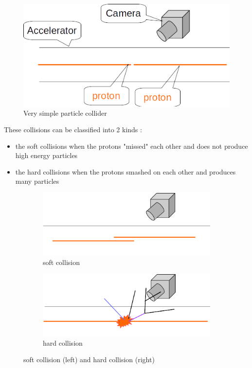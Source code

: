 \begin{figure}[htb]
    \centering
    \includegraphics[width=0.8\linewidth]{particle_collider_0}
    \caption{Very simple particle collider}
    \label{fig:particle_collider_0}
\end{figure}


These collisions can be classified into 2 kinds :
\begin{itemize}
	\item the soft collisions when the protons "missed" each other and does not produce high energy particles
	\item the hard collisions when the protons smashed on each other and produces many particles
\end{itemize}

\begin{figure}[htb]
  \centering
  \begin{subfigure}[t]{0.49\linewidth}
    \includegraphics[width=\linewidth]{particle_collider_soft}
    \caption{soft collision}
    \label{fig:soft_collision}
  \end{subfigure}%
  \hfill
  \begin{subfigure}[t]{0.49\linewidth}
    \includegraphics[width=\linewidth]{particle_collider_hard}
    \caption{hard collision}
    \label{fig:hard_collision}
  \end{subfigure}
  \caption{soft collision (left) and hard collision (right)}
  \label{fig:collision}
\end{figure}

